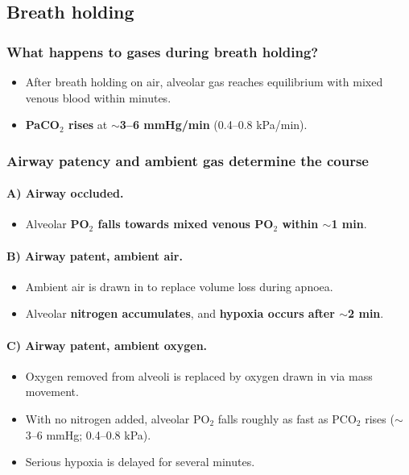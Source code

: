 \documentclass[11pt,a4paper]{article}
\begin{document}
\subsection{Breath holding}

\subsubsection{What happens to gases during breath holding?}
\begin{itemize}
  \item After breath holding on air, alveolar gas reaches equilibrium with mixed venous blood within minutes.
  \item \textbf{PaCO$_2$ rises} at $\sim$\textbf{3--6 mmHg/min} (0.4--0.8 kPa/min).
\end{itemize}

\subsubsection{Airway patency and ambient gas determine the course}

\paragraph{A) Airway occluded.}
\begin{itemize}
  \item Alveolar \textbf{PO$_2$ falls towards mixed venous PO$_2$ within $\sim$1 min}.
\end{itemize}

\paragraph{B) Airway patent, ambient air.}
\begin{itemize}
  \item Ambient air is drawn in to replace volume loss during apnoea.
  \item Alveolar \textbf{nitrogen accumulates}, and \textbf{hypoxia occurs after $\sim$2 min}.
\end{itemize}

\paragraph{C) Airway patent, ambient oxygen.}
\begin{itemize}
  \item Oxygen removed from alveoli is replaced by oxygen drawn in via mass movement.
  \item With no nitrogen added, alveolar PO$_2$ falls roughly as fast as PCO$_2$ rises ($\sim$3--6 mmHg; 0.4--0.8 kPa).
  \item Serious hypoxia is delayed for several minutes.
\end{itemize}
\end{document}
